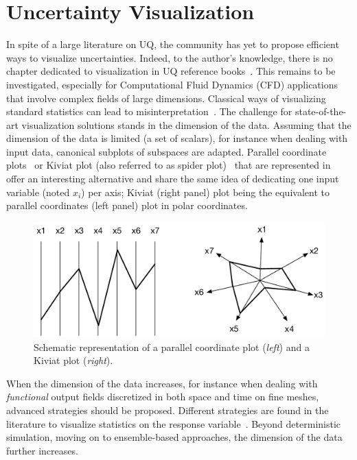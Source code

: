 \section{Uncertainty Visualization}\label{sec:visu}
In spite of a large literature on UQ, the community has yet to propose efficient ways to visualize uncertainties. Indeed, to the author’s knowledge, there is no chapter dedicated to visualization in UQ reference books~\citep{Saltelli2007,Sullivan2015,HandbookUQ}. This remains to be investigated, especially for Computational Fluid Dynamics (CFD) applications~\citep{Moreland2016} that involve complex fields of large dimensions. Classical ways of visualizing standard statistics can lead to misinterpretation~\citep{Anscombe1973}. The challenge for state-of-the-art visualization solutions stands in the dimension of the data. Assuming that the dimension of the data is limited (a set of scalars), for instance when dealing with input data, canonical subplots of subspaces are adapted. Parallel coordinate plots~\citep{Inselberg1985} or Kiviat plot (also referred to as spider plot)~\citep{Hackstadt1994} that are represented in~ offer an interesting alternative and share the same idea of dedicating one input variable (noted $x_i$) per axis; Kiviat (right panel) plot being the equivalent to parallel coordinates (left panel) plot in polar coordinates. 
\begin{figure}[!h]
\centering
\includegraphics[width=0.8\linewidth,keepaspectratio]{fig/literature/parallel-kiviat.pdf}
\caption{Schematic representation of a parallel coordinate plot (\emph{left}) and a Kiviat plot (\emph{right}).}
\label{fig:sketch_Kiviat-parallel}
\end{figure}
When the dimension of the data increases, for instance when dealing with \emph{functional} output fields discretized in both space and time on fine meshes, advanced strategies should be proposed. Different strategies are found in the literature to visualize statistics on the response variable~\citep{Potter2012a,Brodlie2012,Bonneau2014}. Beyond deterministic simulation, moving on to ensemble-based approaches, the dimension of the data further increases.

